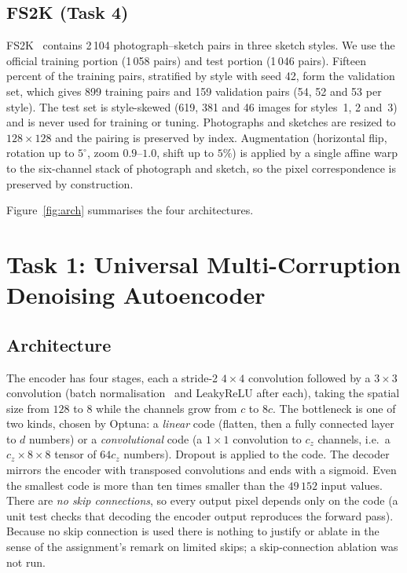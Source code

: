 \documentclass[conference]{IEEEtran}
\begin{document}
\subsection{FS2K (Task 4)}
FS2K~\cite{fan2022} contains 2\,104 photograph--sketch pairs in three sketch styles. We use the official training portion (1\,058 pairs) and test portion (1\,046 pairs). Fifteen percent of the training pairs, stratified by style with seed 42,
form the validation set, which gives 899 training pairs and 159 validation pairs (54, 52 and 53 per style). The test set is style-skewed (619, 381 and 46 images for styles~1, 2 and~3) and is never used for training or tuning.
Photographs and sketches are resized to $128\times128$ and the pairing is preserved by index. Augmentation (horizontal flip, rotation up to $5^\circ$, zoom $0.9$--$1.0$, shift up to $5\%$) is applied
by a single affine warp to the six-channel stack of photograph and sketch, so the pixel correspondence is preserved by construction.


Figure~\ref{fig:arch} summarises the four architectures.

\section{Task 1: Universal Multi-Corruption Denoising Autoencoder}
\subsection{Architecture}
The encoder has four stages, each a stride-2 $4\times4$ convolution followed by a $3\times3$ convolution (batch normalisation~\cite{ioffe2015} and LeakyReLU after each), taking the spatial size from $128$ to $8$ while the channels
grow from $c$ to $8c$. The bottleneck is one of two kinds, chosen by Optuna: a \emph{linear} code (flatten, then a fully connected layer to $d$ numbers) or a \emph{convolutional} code (a $1\times1$ convolution to $c_z$ channels, i.e.\ a
$c_z\times8\times8$ tensor of $64c_z$ numbers). Dropout is applied to the code. The decoder mirrors the encoder with transposed convolutions and ends with a sigmoid. Even the smallest code is more than ten times smaller than the $49\,152$ input values.
There are \emph{no skip connections}, so every output pixel depends only on the code (a unit test checks that decoding the encoder output reproduces the forward pass). Because no skip connection is used there is
nothing to justify or ablate in the sense of the assignment's remark on limited skips; a skip-connection ablation was not run.
\end{document}
